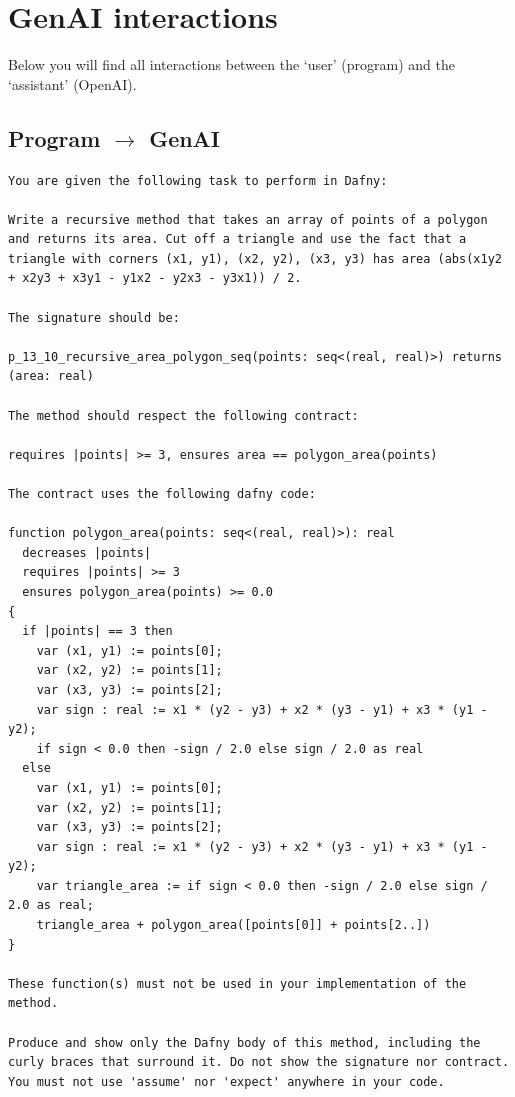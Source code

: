 \documentclass{article}
\begin{document}
\section*{GenAI interactions}
Below you will find all interactions between the `user' (program) and the `assistant' (OpenAI).
\subsection*{Program $\rightarrow$ GenAI}
\begin{lstlisting}
You are given the following task to perform in Dafny:

Write a recursive method that takes an array of points of a polygon and returns its area. Cut off a triangle and use the fact that a triangle with corners (x1, y1), (x2, y2), (x3, y3) has area (abs(x1y2 + x2y3 + x3y1 - y1x2 - y2x3 - y3x1)) / 2.

The signature should be:

p_13_10_recursive_area_polygon_seq(points: seq<(real, real)>) returns (area: real)

The method should respect the following contract:

requires |points| >= 3, ensures area == polygon_area(points)

The contract uses the following dafny code:

function polygon_area(points: seq<(real, real)>): real
  decreases |points|
  requires |points| >= 3
  ensures polygon_area(points) >= 0.0
{
  if |points| == 3 then 
    var (x1, y1) := points[0];
    var (x2, y2) := points[1];
    var (x3, y3) := points[2];
    var sign : real := x1 * (y2 - y3) + x2 * (y3 - y1) + x3 * (y1 - y2);
    if sign < 0.0 then -sign / 2.0 else sign / 2.0 as real 
  else 
    var (x1, y1) := points[0];
    var (x2, y2) := points[1];
    var (x3, y3) := points[2];
    var sign : real := x1 * (y2 - y3) + x2 * (y3 - y1) + x3 * (y1 - y2);
    var triangle_area := if sign < 0.0 then -sign / 2.0 else sign / 2.0 as real;
    triangle_area + polygon_area([points[0]] + points[2..])
}

These function(s) must not be used in your implementation of the method.

Produce and show only the Dafny body of this method, including the curly braces that surround it. Do not show the signature nor contract. You must not use 'assume' nor 'expect' anywhere in your code.
\end{lstlisting}
\end{document}
